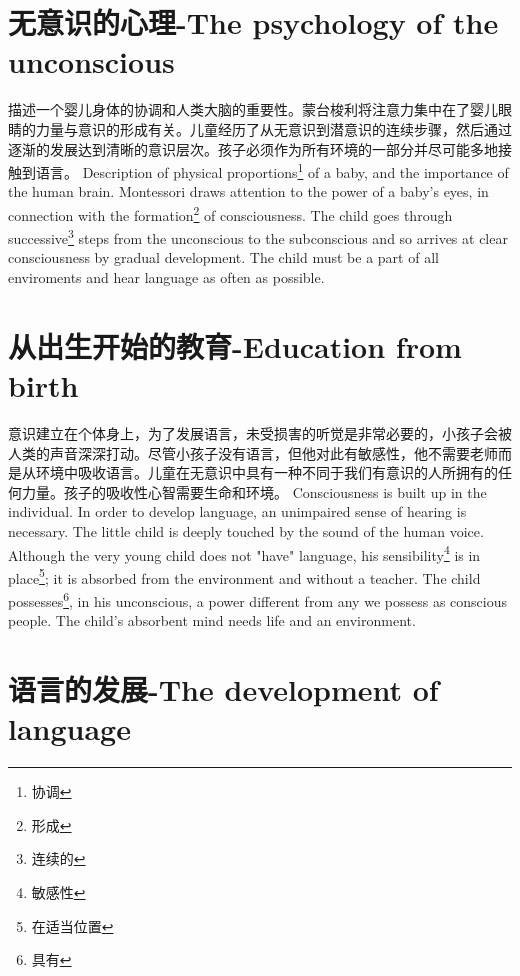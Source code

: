 \documentclass[lang=cn,10pt]{elegantbook}
\begin{document}
\chapter{无意识的心理-The psychology of the unconscious}

\begin{tcolorbox}[title=摘要,
colback=red!5!white,
colframe=red!75!black,
fonttitle=\bfseries]
描述一个婴儿身体的协调和人类大脑的重要性。蒙台梭利将注意力集中在了婴儿眼睛的力量与意识的形成有关。儿童经历了从无意识到潜意识的连续步骤，然后通过逐渐的发展达到清晰的意识层次。孩子必须作为所有环境的一部分并尽可能多地接触到语言。
Description of physical proportions\footnote{协调} of a baby, and the importance of the human brain. Montessori draws attention to the power of a baby's eyes, in connection with the formation\footnote{形成} of consciousness. The child goes through successive\footnote{连续的} steps from the unconscious to the subconscious and so arrives at clear consciousness by gradual development. The child must be a part of all enviroments and hear language as often as possible.
\end{tcolorbox}

\chapter{从出生开始的教育-Education from birth}

\begin{tcolorbox}[title=摘要,
colback=red!5!white,
colframe=red!75!black,
fonttitle=\bfseries]
意识建立在个体身上，为了发展语言，未受损害的听觉是非常必要的，小孩子会被人类的声音深深打动。尽管小孩子没有语言，但他对此有敏感性，他不需要老师而是从环境中吸收语言。儿童在无意识中具有一种不同于我们有意识的人所拥有的任何力量。孩子的吸收性心智需要生命和环境。
Consciousness is built up in the individual. In order to develop language, an unimpaired sense of hearing is necessary. The little child is deeply touched by the sound of the human voice. Although the very young child does not "have" language, his sensibility\footnote{敏感性} is in place\footnote{在适当位置}; it is absorbed from the environment and without a teacher. The child possesses\footnote{具有}, in his unconscious, a power different from any we possess as conscious people. The child's absorbent mind needs life and an environment.
\end{tcolorbox}

\chapter{语言的发展-The development of language}
\end{document}
